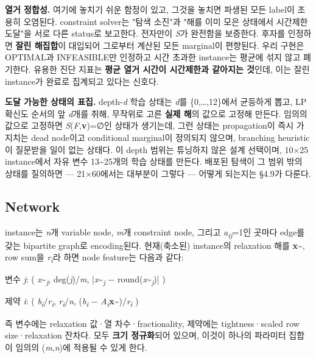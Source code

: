 \documentclass[final,5p,twocolumn]{elsarticle}
\begin{document}
\textbf{열거 정합성.} 여기에 놓치기 쉬운 함정이 있고, 그것을 놓치면 파생된 모든 label이 조용히 오염된다. constraint solver는 "탐색 소진"과 "해를 이미 모은 상태에서 시간제한 도달"을 서로 다른 status로 보고한다. 전자만이 \textit{S}가 완전함을 보증한다. 후자를 인정하면 \textbf{잘린 해집합}이 대입되어 그로부터 계산된 모든 marginal이 편향된다. 우리 구현은 OPTIMAL과 INFEASIBLE만 인정하고 시간 초과한 instance는 평균에 섞지 않고 폐기한다. 유용한 진단 지표는 \textbf{평균 열거 시간이 시간제한과 같아지는 것}인데, 이는 잘린 instance가 완료로 집계되고 있다는 신호다.

\textbf{도달 가능한 상태의 표집.} depth-\textit{d} 학습 상태는 \textit{d}를 \{0,…,12\}에서 균등하게 뽑고, LP 확신도 순서의 앞 \textit{d}개를 취해, 무작위로 고른 \textbf{실제 해}의 값으로 고정해 만든다. 임의의 값으로 고정하면 \textit{S}(\textit{F},\textbf{v})=∅인 상태가 생기는데, 그런 상태는 propagation이 즉시 가지치는 dead node이고 conditional marginal이 정의되지 않으며, branching heuristic이 질문받을 일이 없는 상태다. 이 depth 범위는 튜닝하지 않은 설계 선택이며, 10×25 instance에서 자유 변수 13\textasciitilde{}25개의 학습 상태를 만든다. 배포된 탐색이 그 범위 밖의 상태를 질의하면 — 21×60에서는 대부분이 그렇다 — 어떻게 되는지는 §4.9가 다룬다.

\subsection{Network}
instance는 \textit{n}개 variable node, \textit{m}개 constraint node, 그리고 \textit{a\textsubscript{ij}}=1인 곳마다 edge를 갖는 bipartite graph로 encoding된다. 현재(축소된) instance의 relaxation 해를 \textbf{x}\textasciitilde{}, row sum을 \textit{r\textsubscript{i}}라 하면 node feature는 다음과 같다:

\begin{center}\small 변수 \textit{j}: ( \textit{x}\textasciitilde{}\textsubscript{\textit{j}}, deg(\textit{j})/\textit{m}, |\textit{x}\textasciitilde{}\textsubscript{\textit{j}} − round(\textit{x}\textasciitilde{}\textsubscript{\textit{j}})| )\end{center}
\begin{center}\small 제약 \textit{i}: ( \textit{b\textsubscript{i}}/\textit{r\textsubscript{i}}, \textit{r\textsubscript{i}}/\textit{n}, (\textit{b\textsubscript{i}} − \textit{A\textsubscript{i}}\textbf{x}\textasciitilde{})/\textit{r\textsubscript{i}} )\end{center}
즉 변수에는 relaxation 값·열 차수·fractionality, 제약에는 tightness·scaled row size·relaxation 잔차다. 모두 \textbf{크기 정규화}되어 있으며, 이것이 하나의 파라미터 집합이 임의의 (\textit{m},\textit{n})에 적용될 수 있게 한다.
\end{document}
